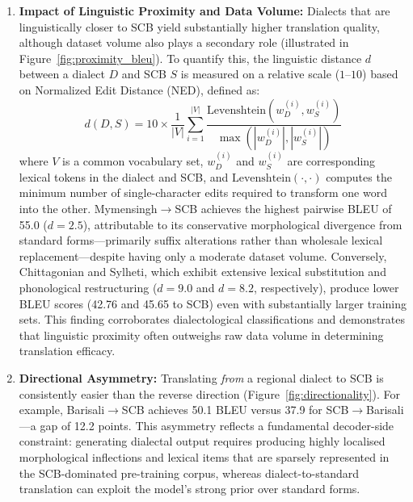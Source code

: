 \documentclass[12pt,a4paper]{article}
\begin{document}
\begin{enumerate}[leftmargin=*]
    \item \textbf{Impact of Linguistic Proximity and Data Volume:} Dialects that are linguistically closer to SCB yield substantially higher translation quality, although dataset volume also plays a secondary role (illustrated in Figure~\ref{fig:proximity_bleu}). To quantify this, the linguistic distance $d$ between a dialect $D$ and SCB $S$ is measured on a relative scale ($1$--$10$) based on Normalized Edit Distance (NED), defined as:
    \begin{equation}
        d(D, S) = 10 \times \frac{1}{|V|} \sum_{i=1}^{|V|} \frac{\text{Levenshtein}(w_{D}^{(i)}, w_{S}^{(i)})}{\max(|w_{D}^{(i)}|, |w_{S}^{(i)}|)}
    \end{equation}
    where $V$ is a common vocabulary set, $w_{D}^{(i)}$ and $w_{S}^{(i)}$ are corresponding lexical tokens in the dialect and SCB, and $\text{Levenshtein}(\cdot, \cdot)$ computes the minimum number of single-character edits required to transform one word into the other. 
    Mymensingh$\rightarrow$SCB achieves the highest pairwise BLEU of 55.0 ($d=2.5$), attributable to its conservative morphological divergence from standard forms---primarily suffix alterations rather than wholesale lexical replacement---despite having only a moderate dataset volume. Conversely, Chittagonian and Sylheti, which exhibit extensive lexical substitution and phonological restructuring ($d=9.0$ and $d=8.2$, respectively), produce lower BLEU scores (42.76 and 45.65 to SCB) even with substantially larger training sets. This finding corroborates dialectological classifications \cite{chatterji1926origin} and demonstrates that linguistic proximity often outweighs raw data volume in determining translation efficacy.
    \item \textbf{Directional Asymmetry:} Translating \textit{from} a regional dialect to SCB is consistently easier than the reverse direction (Figure~\ref{fig:directionality}). For example, Barisali$\rightarrow$SCB achieves 50.1 BLEU versus 37.9 for SCB$\rightarrow$Barisali---a gap of 12.2 points. This asymmetry reflects a fundamental decoder-side constraint: generating dialectal output requires producing highly localised morphological inflections and lexical items that are sparsely represented in the SCB-dominated pre-training corpus, whereas dialect-to-standard translation can exploit the model's strong prior over standard forms.
\end{enumerate}
\end{document}
